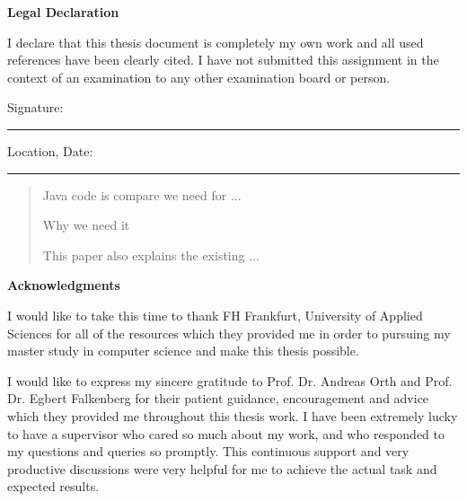 \documentclass{report}
\begin{document}
\doublespacing
\null\vfil
\begin{center}{\huge\bf Legal Declaration\par}\end{center}
\null
I declare that this thesis document is completely my own work and all used references have been clearly cited. I have not submitted this assignment in the context of an examination to any other examination board or person.\\[2.5cm]

\begin{flushleft}
Signature:\\
\rule[1em]{25em}{0.5pt} %
 
Location, Date:\\
\rule[1em]{25em}{0.5pt} %
\end{flushleft}


\newpage
\pagestyle{fancy}
\fancyhead{}
\renewcommand{\headrulewidth}{0pt}
\renewcommand{\footrulewidth}{0.4pt}
\begin{abstract}
\large
Java code is compare we need for ...

\par Why we need it


\par This paper also explains the existing ...
\end{abstract}

\newpage
\begin{center}{\huge\bf Acknowledgments\par}\end{center}
\null
I would like to take this time to thank FH Frankfurt, University of Applied Sciences for all of the resources which they provided me in order to pursuing my master study in computer science and make this thesis possible.\vspace{5 mm}

\noindent I would like to express my sincere gratitude to Prof. Dr. Andreas Orth and Prof. Dr. Egbert Falkenberg for their patient guidance, encouragement and advice which they provided me throughout this thesis work. I have been extremely lucky to have a supervisor who cared so much about my work, and who responded to my questions and queries so promptly. This continuous support and very productive discussions were very helpful for me to achieve the actual task and expected results.\vspace{5 mm}
\end{document}
